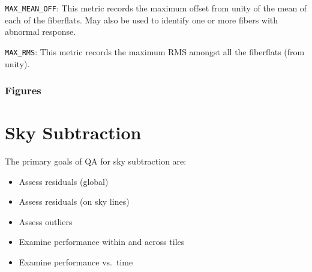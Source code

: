 \documentclass[12pt]{article}
\begin{document}
\noindent
{\tt MAX\_MEAN\_OFF}:  This metric records the maximum offset from
unity of the mean of each of the fiberflats.  May also be used
to identify one or more fibers with abnormal response.

\noindent
{\tt MAX\_RMS}:  This metric records the maximum RMS amongst
all the fiberflats (from unity).

\subsubsection{Figures}

\section{Sky Subtraction}

The primary goals of QA for sky subtraction are:

\begin{itemize}
\item Assess residuals (global)
\item Assess residuals (on sky lines)
\item Assess outliers
\item Examine performance within and across tiles
\item Examine performance vs.\ time
\end{itemize}



\def\apjl{ApJL} %
\def\aj{AJ} %
\def\apj{ApJ} %
\def\pasp{PASP} %
\def\spie{SPIE} %
\def\apjs{ApJS} %
\def\araa{ARAA} %
\def\aap{A\&A} %
\def\aaps{A\&A~Supl.} %
\def\nat{Nature} %
\def\nar{New Astron. Rev.} %
\def\mnras{MNRAS} %
\def\jcap{JCAP} %
\def\prd{{Phys.~Rev.~D}}        %
\def\physrep{{Phys.~Reports}} %



\end{document}
